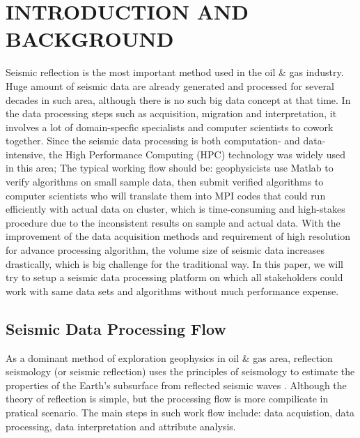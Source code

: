 %
%
%



\pagestyle{plain} %
\setcounter{page}{1}


\chapter{\uppercase {Introduction and Background}}

Seismic reflection is the most important method used in the oil \& gas industry. Huge amount of seismic data are already generated and processed for several decades in such area, although there is no such big data concept at that time. In the data processing steps such as acquisition, migration and interpretation, it involves a lot of domain-specfic specialists and computer scientists to cowork together. Since the seismic data processing is both computation- and data-intensive, the High Performance Computing (HPC) technology was widely used in this area; The typical working flow should be: geophysicists use Matlab to verify algorithms on small sample data, then submit verified algorithms to computer scientists who will translate them into MPI codes that could run efficiently with actual data on cluster, which is time-consuming and high-stakes procedure due to the inconsistent results on sample and actual data. With the improvement of the data acquisition methods and requirement of high resolution for advance processing algorithm, the volume size of seismic data increases drastically, which is big challenge for the traditional way. In this paper, we will try to setup a seismic data processing platform on which all stakeholders could work with same data sets and algorithms without much performance expense.

\section{Seismic Data Processing Flow}
As a dominant method of exploration geophysics in oil \& gas area, reflection seismology (or seismic reflection) uses the principles of seismology to estimate the properties of the Earth's subsurface from reflected seismic waves \cite{seisreflection}. Although the theory of reflection is simple, but the processing flow is more compilicate in pratical scenario. The main steps in such work flow include: data acquistion, data processing, data interpretation and attribute analysis.

